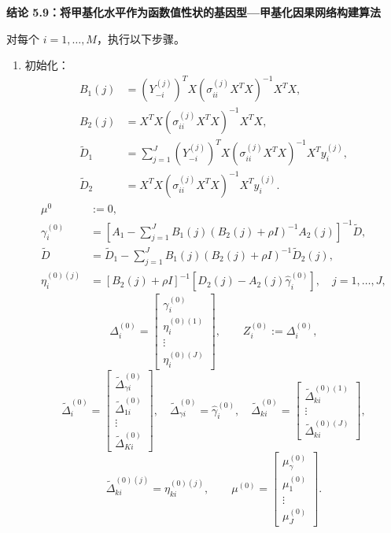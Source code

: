 \par\medskip{}
\noindent\textbf{结论 5.9：将甲基化水平作为函数值性状的基因型—甲基化因果网络构建算法}\par
对每个 $i=1,\ldots,M$，执行以下步骤。
\begin{enumerate}[label=步骤 \arabic*：,leftmargin=4.8em]
\item 初始化：
\[
\begin{aligned}
B_1(j)&=(Y_{-i}^{(j)})^TX(\sigma_{ii}^{(j)}X^TX)^{-1}X^TX,\\
B_2(j)&=X^TX(\sigma_{ii}^{(j)}X^TX)^{-1}X^TX,\\
\widetilde D_1&=\sum_{j=1}^J(Y_{-i}^{(j)})^TX(\sigma_{ii}^{(j)}X^TX)^{-1}X^Ty_i^{(j)},\\
\widetilde D_2&=X^TX(\sigma_{ii}^{(j)}X^TX)^{-1}X^Ty_i^{(j)}.
\end{aligned}
\]
\[
\begin{aligned}
\mu^0&:=0,\\
\gamma_i^{(0)}&=\left[A_1-\sum_{j=1}^JB_1(j)(B_2(j)+\rho I)^{-1}A_2(j)\right]^{-1}\widetilde D,\\
\widetilde D&=\widetilde D_1-\sum_{j=1}^JB_1(j)(B_2(j)+\rho I)^{-1}\widetilde D_2(j),\\
\eta_i^{(0)(j)}&=[B_2(j)+\rho I]^{-1}[D_2(j)-A_2(j)\widehat\gamma_i^{(0)}],\quad j=1,\ldots,J,
\end{aligned}
\]
\[
\Delta_i^{(0)}=\begin{bmatrix}\gamma_i^{(0)}\\\eta_i^{(0)(1)}\\\vdots\\\eta_i^{(0)(J)}\end{bmatrix},\qquad
Z_i^{(0)}:=\Delta_i^{(0)},
\]
\[
\widetilde\Delta_i^{(0)}=\begin{bmatrix}\widetilde\Delta_{\gamma i}^{(0)}\\\widetilde\Delta_{1i}^{(0)}\\\vdots\\\widetilde\Delta_{Ki}^{(0)}\end{bmatrix},\quad
\widetilde\Delta_{\gamma i}^{(0)}=\widehat\gamma_i^{(0)},\quad
\widetilde\Delta_{ki}^{(0)}=\begin{bmatrix}\widetilde\Delta_{ki}^{(0)(1)}\\\vdots\\\widetilde\Delta_{ki}^{(0)(J)}\end{bmatrix},
\]
\[
\widetilde\Delta_{ki}^{(0)(j)}=\eta_{ki}^{(0)(j)},\qquad
\mu^{(0)}=\begin{bmatrix}\mu_\gamma^{(0)}\\\mu_1^{(0)}\\\vdots\\\mu_J^{(0)}\end{bmatrix}.
\]
\end{enumerate}
